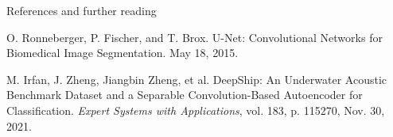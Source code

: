\documentclass[]{beamer}
\begin{document}
\begin{frame}{References and further reading}
    \small
    \begin{thebibliography}{99} 
        O. Ronneberger, P. Fischer, and T. Brox.
        \newblock U-Net: Convolutional Networks for Biomedical Image Segmentation.
        \newblock May 18, 2015.

        M. Irfan, J. Zheng, Jiangbin Zheng, et al.
        \newblock DeepShip: An Underwater Acoustic Benchmark Dataset and a Separable Convolution-Based Autoencoder for Classification.
        \newblock \emph{Expert Systems with Applications}, vol. 183, p. 115270, Nov. 30, 2021.

    \end{thebibliography}
\end{frame}
\end{document}
